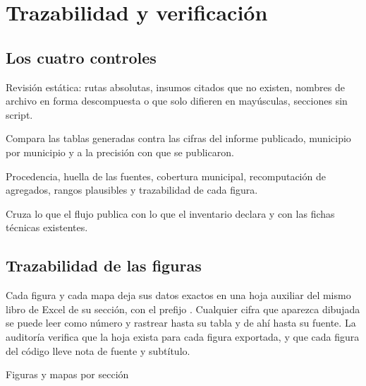 \documentclass[11pt,a4paper]{article}
\begin{document}
\section{Trazabilidad y verificación}
\label{sec:trazabilidad}

\subsection{Los cuatro controles}

\begin{description}[leftmargin=*, style=nextline, itemsep=3pt]
  \item[\fn{check\_pipeline.R}] Revisión estática: rutas absolutas, insumos
    citados que no existen, nombres de archivo en forma descompuesta o que solo
    difieren en mayúsculas, secciones sin script.
  \item[\fn{comparar\_referencia.R}] Compara las tablas generadas contra las
    cifras del informe publicado, municipio por municipio y a la precisión con
    que se publicaron.
  \item[\fn{auditoria\_end\_to\_end.R}] Procedencia, huella de las fuentes,
    cobertura municipal, recomputación de agregados, rangos plausibles y
    trazabilidad de cada figura.
  \item[\fn{diccionario\_indicadores.R}] Cruza lo que el flujo publica con lo
    que el inventario declara y con las fichas técnicas existentes.
\end{description}

\subsection{Trazabilidad de las figuras}

Cada figura y cada mapa deja sus datos exactos en una hoja auxiliar del mismo
libro de Excel de su sección, con el prefijo \fn{\_}. Cualquier cifra que
aparezca dibujada se puede leer como número y rastrear hasta su tabla y de ahí
hasta su fuente. La auditoría verifica que la hoja exista para cada figura
exportada, y que cada figura del código lleve nota de fuente y subtítulo.

\begin{table}[htbp]\centering
\caption{Figuras y mapas por sección}
\small

\end{table}
\end{document}
